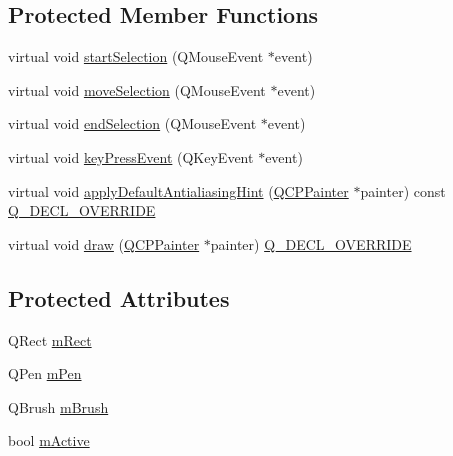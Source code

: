 \subsection*{Protected Member Functions}
\begin{DoxyCompactItemize}
\item 
virtual void \mbox{\hyperlink{class_q_c_p_selection_rect_a271f24cfca8bc50a0e2b4310ff90e227}{start\+Selection}} (Q\+Mouse\+Event $\ast$event)
\item 
virtual void \mbox{\hyperlink{class_q_c_p_selection_rect_a95c3f1700be2a6d7bba0fe56ece5fbb1}{move\+Selection}} (Q\+Mouse\+Event $\ast$event)
\item 
virtual void \mbox{\hyperlink{class_q_c_p_selection_rect_a625bcffd73987f6de6c6559aaf29ab9d}{end\+Selection}} (Q\+Mouse\+Event $\ast$event)
\item 
virtual void \mbox{\hyperlink{class_q_c_p_selection_rect_a1affe764316d6122a26fdb2e9583feb1}{key\+Press\+Event}} (Q\+Key\+Event $\ast$event)
\item 
virtual void \mbox{\hyperlink{class_q_c_p_selection_rect_aa854697618e16037ba9c73056abfb9bf}{apply\+Default\+Antialiasing\+Hint}} (\mbox{\hyperlink{class_q_c_p_painter}{Q\+C\+P\+Painter}} $\ast$painter) const \mbox{\hyperlink{qcustomplot_8h_a42cc5eaeb25b85f8b52d2a4b94c56f55}{Q\+\_\+\+D\+E\+C\+L\+\_\+\+O\+V\+E\+R\+R\+I\+DE}}
\item 
virtual void \mbox{\hyperlink{class_q_c_p_selection_rect_ab0e50ae796508bdcd97ab8c335c593bf}{draw}} (\mbox{\hyperlink{class_q_c_p_painter}{Q\+C\+P\+Painter}} $\ast$painter) \mbox{\hyperlink{qcustomplot_8h_a42cc5eaeb25b85f8b52d2a4b94c56f55}{Q\+\_\+\+D\+E\+C\+L\+\_\+\+O\+V\+E\+R\+R\+I\+DE}}
\end{DoxyCompactItemize}
\subsection*{Protected Attributes}
\begin{DoxyCompactItemize}
\item 
Q\+Rect \mbox{\hyperlink{class_q_c_p_selection_rect_a45a2600ef19c8f7b5ec6134beab036cf}{m\+Rect}}
\item 
Q\+Pen \mbox{\hyperlink{class_q_c_p_selection_rect_ae255dec12cd531071115bd667f0fd815}{m\+Pen}}
\item 
Q\+Brush \mbox{\hyperlink{class_q_c_p_selection_rect_a1bda3f02c2e4da58c856d19695028cbe}{m\+Brush}}
\item 
bool \mbox{\hyperlink{class_q_c_p_selection_rect_a1c167356b0bc59e62691bff8c90f5851}{m\+Active}}
\end{DoxyCompactItemize}
